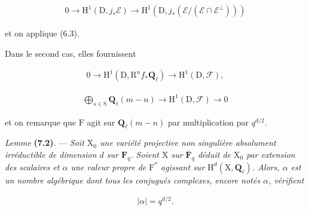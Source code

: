 \documentclass[10pt,leqno]{article}
\begin{document}
\begin{equation*}\begin{gathered}0 \longrightarrow  \mathrm{H}^{1}(\mathrm{D},j_{*}\mathcal{E} ) \longrightarrow  \mathrm{H}^{1}(\mathrm{D},j_{*}(\mathcal{E} /(\mathcal{E} \cap \mathcal{E} ^{\perp })))\end{gathered}\tag{7.1.3′}\end{equation*}

\noindent et on applique (6.3).\par

\noindent Dans le second cas, elles fournissent\par

\begin{equation*}\begin{gathered}0 \longrightarrow  \mathrm{H}^{1}(\mathrm{D},\mathrm{R}^{n} f_{*}\mathbf{Q}_{\ell }) \longrightarrow  \mathrm{H}^{1}(\mathrm{D},\mathcal{F} ),\end{gathered}\tag{7.1.4′}\end{equation*}

\begin{equation*}\begin{gathered}\bigoplus\limits_{s\in \mathrm{S}}\mathbf{Q}_{\ell }(m- n) \longrightarrow  \mathrm{H}^{1}(\mathrm{D},\mathcal{F} ) \longrightarrow  0\end{gathered}\tag{7.1.5′}\end{equation*}

\noindent et on remarque que \(\mathrm{F}\) agit sur \(\mathbf{Q}_{\ell }(m- n)\) par multiplication par \(q^{d/2}\).\par

\noindent \emph{Lemme} \textbf{(7.2)}. — {\itshape Soit \(\mathrm{X}_{0}\) une variété projective non singulière absolument irréductible de dimension \(d\) sur \(\mathbf{F}_{q}\). Soient \(\mathrm{X}\) sur \(\overline{\mathbf{F}}_{q}\) déduit de \(\mathrm{X}_{0}\) par extension des scalaires et \(\alpha \) une valeur propre de \(\mathrm{F}^{*}\) agissant sur \(\mathrm{H}^{d}(\mathrm{X},\mathbf{Q}_{\ell })\). Alors, \(\alpha \) est un nombre algébrique dont tous les conjugués complexes, encore notés \(\alpha \), vérifient}\par

\begin{equation*}\begin{gathered}|\alpha |=q^{d/2}.\end{gathered}\end{equation*}
\end{document}
